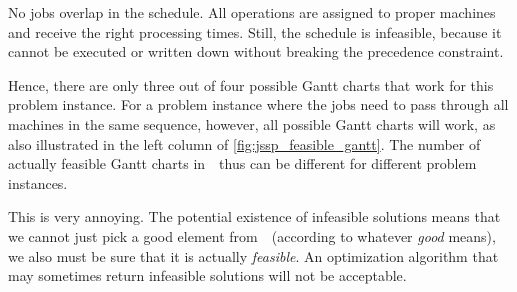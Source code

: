 No jobs overlap in the schedule.
All operations are assigned to proper machines and receive the right processing times.
Still, the schedule is infeasible, because it cannot be executed or written down without breaking the precedence constraint.

Hence, there are only three out of four possible Gantt charts that work for this problem instance.
For a problem instance where the jobs need to pass through all machines in the same sequence, however, all possible Gantt charts will work, as also illustrated in the left column of \autoref{fig:jssp_feasible_gantt}.
The number of actually feasible Gantt charts in~\solutionSpace\ thus can be different for different problem instances.

This is very annoying.
The potential existence of infeasible solutions means that we cannot just pick a good element from~\solutionSpace\ (according to whatever \emph{good} means), we also must be sure that it is actually \emph{feasible}.
An optimization algorithm that may sometimes return infeasible solutions will not be acceptable.%
\endhsection%
%
%
%
